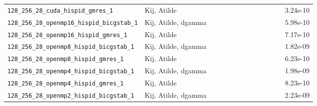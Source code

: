 \documentclass[11pt]{article}
\begin{document}
\begin{longtable}{p{0.44\linewidth}p{0.29\linewidth}r}
\nolinkurl{128_256_28_cuda_hispid_gmres_1} & Kij, Atilde & 3.24e-10\\
\nolinkurl{128_256_28_openmp16_hispid_bicgstab_1} & Kij, Atilde, dgamma & 5.98e-10\\
\nolinkurl{128_256_28_openmp16_hispid_gmres_1} & Kij, Atilde & 7.17e-10\\
\nolinkurl{128_256_28_openmp8_hispid_bicgstab_1} & Kij, Atilde, dgamma & 1.82e-09\\
\nolinkurl{128_256_28_openmp8_hispid_gmres_1} & Kij, Atilde & 6.23e-10\\
\nolinkurl{128_256_28_openmp4_hispid_bicgstab_1} & Kij, Atilde, dgamma & 1.98e-09\\
\nolinkurl{128_256_28_openmp4_hispid_gmres_1} & Kij, Atilde & 8.23e-10\\
\nolinkurl{128_256_28_openmp2_hispid_bicgstab_1} & Kij, Atilde, dgamma & 2.23e-09\\
\bottomrule\end{longtable}\normalsize
\end{document}
